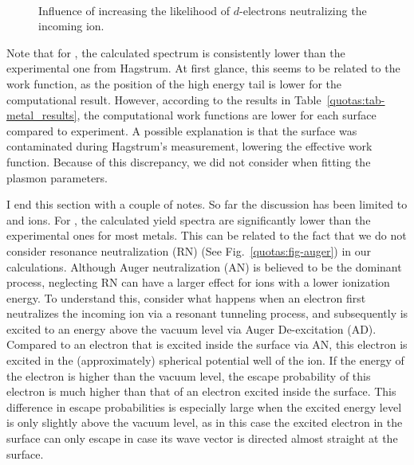 \begin{refsection}
\begin{figure}[ht] 
    \centering 
    \captionsetup{width=0.9\textwidth}
    \begin{subfigure}[t]{0.49\textwidth} 
        \centering 
         
    \end{subfigure}%
    ~  
    \begin{subfigure}[t]{0.49\textwidth} 
        \centering 
         
    \end{subfigure} 
    \caption{\label{quotas:fig-d_influence} Influence of increasing the 
likelihood of $d$-electrons neutralizing the incoming ion.} 
\end{figure} 

Note that for , the calculated spectrum is consistently lower than the 
experimental one from Hagstrum. At first glance, this seems to be related to 
the work function, as the position of the high energy tail is lower for the 
computational result. However, according to the results in 
Table~\ref{quotas:tab-metal_results}, the computational work functions are 
lower for each surface compared to experiment. A possible explanation is that 
the  surface was contaminated during Hagstrum's measurement, lowering 
the effective work function. Because of this discrepancy, we did not consider 
 when fitting the plasmon parameters. 

I end this section with a couple of notes. So far the discussion has been limited 
to  and  ions. For , the calculated yield spectra 
are significantly lower than the experimental ones for most metals. This 
can be related to the fact that we do not consider resonance neutralization (RN)
(See Fig.~\ref{quotas:fig-auger}) in our calculations. Although Auger 
neutralization (AN) is believed to be the dominant process, neglecting RN 
can have a larger effect for ions with a lower ionization energy. 
To understand this, consider what happens when an electron first neutralizes
the incoming ion via a resonant tunneling process, and subsequently is excited
to an energy above the vacuum level via Auger De-excitation (AD). Compared 
to an electron that is excited inside the surface via AN, this electron is excited in 
the (approximately) spherical potential well of the ion. If the energy of the 
electron is higher than the vacuum level, the escape probability of this 
electron is much higher than that of an electron excited inside the surface. 
This difference in escape probabilities is especially large when the excited 
energy level is only slightly above the vacuum level, as in this case the 
excited electron in the surface can only escape in case its wave vector is 
directed almost straight at the surface.


\end{refsection}
